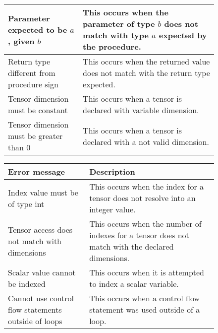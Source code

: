 \begin{figure}[h]
\begin{tabular}{p{1.5in}p{2.5in}}
        \midrule Parameter expected \newline to be $a$, given $b$ &
        This occurs when the parameter of type $b$ does not match with type $a$
        expected by the procedure.\\

        \midrule Return type \newline different from \newline procedure sign &
        This occurs when the returned value does not match with the return
        type expected.\\

        \midrule Tensor dimension must be constant &
	This occurs when a tensor is declared with variable dimension.\\

        \midrule Tensor dimension must be greater than 0 &
	This occurs when a tensor is declared with a not valid dimension.\\

        \bottomrule
    \end{tabular}
\end{figure}

\newpage

\begin{figure}[h]
    \centering
    \begin{tabular}{p{1.5in}p{2.5in}}
        \toprule
        \textbf{Error message} & \textbf{Description}\\

        \midrule Index value must be of type int &
	This occurs when the index for a tensor does not resolve into an
	integer value.\\

        \midrule Tensor access does not match with dimensions &
	This occurs when the number of indexes for a tensor does not match
	with the declared dimensions.\\

        \midrule Scalar value cannot be indexed &
	This occurs when it is attempted to index a scalar variable.\\

        \midrule Cannot use control flow statements outside of loops &
	This occurs when a control flow statement was used outside of a loop.\\

        \bottomrule
    \end{tabular}
\end{figure}

